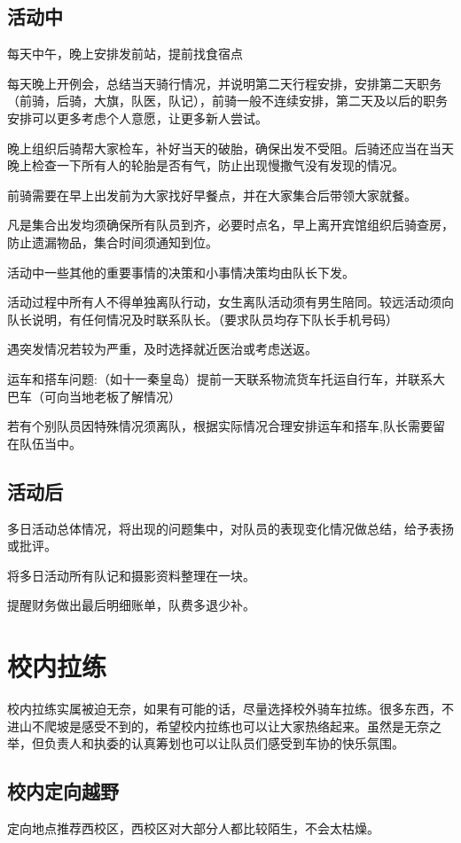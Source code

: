 \documentclass{ctexbook}
\begin{document}
\subsection{活动中}

每天中午，晚上安排发前站，提前找食宿点

每天晚上开例会，总结当天骑行情况，并说明第二天行程安排，安排第二天职务（前骑，后骑，大旗，队医，队记），前骑一般不连续安排，第二天及以后的职务安排可以更多考虑个人意愿，让更多新人尝试。

晚上组织后骑帮大家检车，补好当天的破胎，确保出发不受阻。后骑还应当在当天晚上检查一下所有人的轮胎是否有气，防止出现慢撒气没有发现的情况。

前骑需要在早上出发前为大家找好早餐点，并在大家集合后带领大家就餐。

凡是集合出发均须确保所有队员到齐，必要时点名，早上离开宾馆组织后骑查房，防止遗漏物品，集合时间须通知到位。

活动中一些其他的重要事情的决策和小事情决策均由队长下发。

活动过程中所有人不得单独离队行动，女生离队活动须有男生陪同。较远活动须向队长说明，有任何情况及时联系队长。（要求队员均存下队长手机号码）

遇突发情况若较为严重，及时选择就近医治或考虑送返。

运车和搭车问题:（如十一秦皇岛）提前一天联系物流货车托运自行车，并联系大巴车（可向当地老板了解情况）

若有个别队员因特殊情况须离队，根据实际情况合理安排运车和搭车,队长需要留在队伍当中。

\subsection{活动后}

多日活动总体情况，将出现的问题集中，对队员的表现变化情况做总结，给予表扬或批评。

将多日活动所有队记和摄影资料整理在一块。

提醒财务做出最后明细账单，队费多退少补。


\section{校内拉练}
校内拉练实属被迫无奈，如果有可能的话，尽量选择校外骑车拉练。很多东西，不进山不爬坡是感受不到的，希望校内拉练也可以让大家热络起来。虽然是无奈之举，但负责人和执委的认真筹划也可以让队员们感受到车协的快乐氛围。

\subsection{校内定向越野}
定向地点推荐西校区，西校区对大部分人都比较陌生，不会太枯燥。
\end{document}
